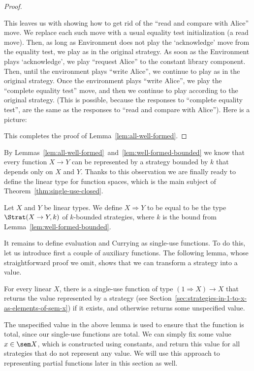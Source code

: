 \begin{proof}
\begin{enumerate}
    This leaves us with showing how to get rid of the ``read and compare with Alice'' move. 
    We replace each such move with a usual equality test initialization (a read move). 
    Then, as long as Environment does not play the `acknowledge' move from the equality test, 
    we play as in the original strategy. As soon as the Environment plays `acknowledge', 
    we play ``request Alice'' to the constant library component. Then, until the environment 
    plays ``write Alice'', we continue to play as in the original strategy. Once the environment
    plays ``write Alice'', we play the ``complete equality test'' move, and then we continue 
    to play according to the original strategy. (This is possible, because the responses 
    to ``complete equality test'', are the same as the responses to ``read and compare with Alice''). 
    Here is a picture:
    \end{enumerate}
    This completes the proof of Lemma~\ref{lem:all-well-formed}. 
\end{proof}
By Lemmas~\ref{lem:all-well-formed}~and~\ref{lem:well-formed-bounded} we know that every function $X \to Y$ 
can be represented by a strategy bounded by $k$ that depends only on $X$ and $Y$. Thanks to this observation 
we are finally ready to define the linear type for function spaces, which is the main subject of Theorem~\ref{thm:single-use-closed}.
\begin{definition} Let $X$ and $Y$ be linear types. 
    We define $X \Rightarrow Y$ to be equal to be the type  $\Strat(X \to Y, k)$ of $k$-bounded strategies, where $k$ is the bound from Lemma~\ref{lem:well-formed-bounded}.
\end{definition}

It remains to define evaluation and Currying as single-use functions. To do this, 
let us introduce first a couple of auxiliary functions.
The following lemma, whose straightforward proof we omit, shows that we can transform a strategy into a value. 
\begin{lemma}\label{lem:evaluate-to-values}
    For every linear $X$, there is a single-use function of type $(1 \Rightarrow X) \to X$ that returns the value represented by a strategy (see  Section~\ref{sec:strategies-in-1-to-x-as-elements-of-sem-x}) if it exists, and otherwise returns some unspecified  value.
\end{lemma}

The unspecified value in the above lemma is used to ensure that the function is total, since our single-use functions are total. We can simply fix some value $x \in \sem X$, which is constructed using constants, and return this value for all strategies that do not represent any value. We will use this approach to representing partial functions later in this section as well.

